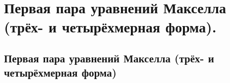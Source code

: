 \chapter{Первая пара уравнений Макселла (трёх- и четырёхмерная форма).}

\section{Первая пара уравнений Макселла (трёх- и четырёхмерная форма)}
